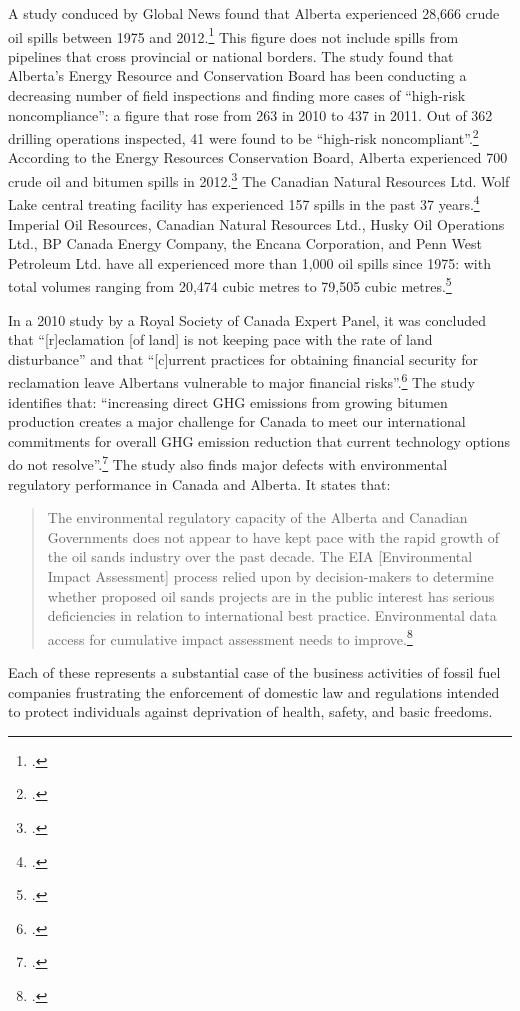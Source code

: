 A study conduced by Global News found that Alberta experienced 28,666 crude oil spills between 1975 and 2012.\footcite[][]{Young37Years}
This figure does not include spills from pipelines that cross provincial or national borders.
The study found that Alberta's Energy Resource and Conservation Board has been conducting a decreasing number of field inspections and finding more cases of ``high-risk noncompliance'': a figure that rose from 263 in 2010 to 437 in 2011.
Out of 362 drilling operations inspected, 41 were found to be ``high-risk noncompliant''.\footcite[][]{YoungPapernyRegulators}
According to the Energy Resources Conservation Board, Alberta experienced 700 crude oil and bitumen spills in 2012.\footcite[][]{YoungPapernyAnatomy}
The Canadian Natural Resources Ltd. Wolf Lake central treating facility has experienced 157 spills in the past 37 years.\footcite[][]{YoungPapernyAnatomy}
Imperial Oil Resources, Canadian Natural Resources Ltd., Husky Oil Operations Ltd., BP Canada Energy Company, the Encana Corporation, and Penn West Petroleum Ltd. have all experienced more than 1,000 oil spills since 1975: with total volumes ranging from 20,474 cubic metres to 79,505 cubic metres.\footcite[][]{YoungPapernyAnatomy}



In a 2010 study by a Royal Society of Canada Expert Panel, it was concluded that ``[r]eclamation [of land] is not keeping pace with the rate of land disturbance'' and that ``[c]urrent practices for obtaining financial security for reclamation leave Albertans vulnerable to major financial risks''.\footcite[][p. 5]{RoyalSocEnvHealth}
The study identifies that: ``increasing direct GHG emissions from growing bitumen production creates a major challenge for Canada to meet our international commitments for overall GHG emission reduction that current technology options do not resolve''.\footcite[][p. 5]{RoyalSocEnvHealth}
The study also finds major defects with environmental regulatory performance in Canada and Alberta.
It states that:
\begin{quote}
The environmental regulatory capacity of the Alberta and Canadian Governments does not appear to have kept pace with the rapid growth of the oil sands industry over the past decade. The EIA [Environmental Impact Assessment] process relied upon by decision-makers to determine whether proposed oil sands projects are in the public interest has serious deficiencies in relation to international best practice. Environmental data access for cumulative impact assessment needs to improve.\footcite[][p. 5]{RoyalSocEnvHealth}
\end{quote}
Each of these represents a substantial case of the business activities of fossil fuel companies frustrating the enforcement of domestic law and regulations intended to protect individuals against deprivation of health, safety, and basic freedoms.



